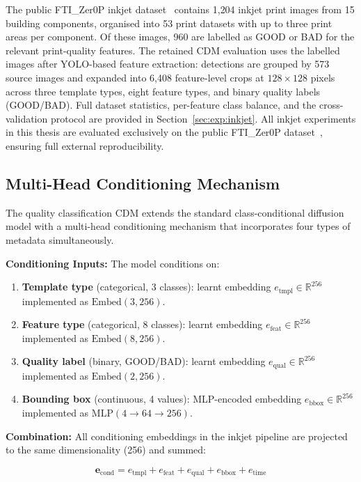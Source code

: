 The public FTI\_Zer0P inkjet dataset~\citep{profactor2024fti} contains 1{,}204 inkjet print images from 15 building components, organised into 53 print datasets with up to three print areas per component. Of these images, 960 are labelled as GOOD or BAD for the relevant print-quality features. The retained CDM evaluation uses the labelled images after YOLO-based feature extraction: detections are grouped by 573 source images and expanded into 6{,}408 feature-level crops at $128 \times 128$ pixels across three template types, eight feature types, and binary quality labels (GOOD/BAD). Full dataset statistics, per-feature class balance, and the cross-validation protocol are provided in Section~\ref{sec:exp:inkjet}.
All inkjet experiments in this thesis are evaluated exclusively on the public FTI\_Zer0P dataset~\citep{profactor2024fti}, ensuring full external reproducibility.

\subsection{Multi-Head Conditioning Mechanism}
\label{sec:meth:inkjet:multihead}

The quality classification CDM extends the standard class-conditional diffusion model with a multi-head conditioning mechanism that incorporates four types of metadata simultaneously.

\textbf{Conditioning Inputs:} The model conditions on:
\begin{enumerate}
    \item \textbf{Template type} (categorical, 3 classes): learnt embedding $e_{\text{tmpl}} \in \mathbb{R}^{256}$ implemented as $\text{Embed}(3, 256)$.
    \item \textbf{Feature type} (categorical, 8 classes): learnt embedding $e_{\text{feat}} \in \mathbb{R}^{256}$ implemented as $\text{Embed}(8, 256)$.
    \item \textbf{Quality label} (binary, GOOD/BAD): learnt embedding $e_{\text{qual}} \in \mathbb{R}^{256}$ implemented as $\text{Embed}(2, 256)$.
    \item \textbf{Bounding box} (continuous, 4 values): MLP-encoded embedding $e_{\text{bbox}} \in \mathbb{R}^{256}$ implemented as $\text{MLP}(4 \to 64 \to 256)$.
\end{enumerate}

\textbf{Combination:} All conditioning embeddings in the inkjet pipeline are projected to the same dimensionality (256) and summed:

\begin{equation}
\label{eq:meth:conditioning}
\mathbf{e}_{\mathrm{cond}} = e_{\text{tmpl}} + e_{\text{feat}} + e_{\text{qual}} + e_{\text{bbox}} + e_{\text{time}}
\end{equation}

